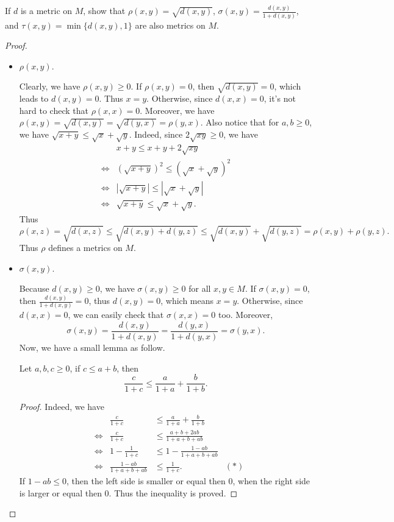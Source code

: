 \documentclass[12pt, a4paper]{article}
\theoremstyle{plain}
\begin{document}
\begin{exercise}{6}
If $d$ is a metric on $M$, show that $\rho(x,y)=\sqrt{d(x,y)}$, $\sigma(x,y)=\frac{d(x,y)}{1+d(x,y)}$, and $\tau(x,y)=\min\{d(x,y),1\}$ are also metrics on $M$. 
\end{exercise}
	\begin{proof}
	\hfill
		\begin{itemize}
		\item $\rho(x,y)$.
		
Clearly, we have $\rho(x,y)\geq 0$. If $\rho(x,y)=0$, then $\sqrt{d(x,y)}=0$, which leads to $d(x,y)=0$. Thus $x=y$. Otherwise, since $d(x,x)=0$, it's not hard to check that $\rho(x,x)=0$. Moreover, we have $\rho(x,y)=\sqrt{d(x,y)}=\sqrt{d(y,x)}=\rho(y,x)$. Also notice that for $a,b\geq 0$, we have $\sqrt{x+y}\leq \sqrt{x}+\sqrt{y}$. Indeed, since $2\sqrt{xy}\geq 0$, we have
		\begin{align*}
		&x+y\leq x+y+2\sqrt{xy}\\
		\Leftrightarrow &(\sqrt{x+y})^2\leq (\sqrt{x}+\sqrt{y})^2\\
		\Leftrightarrow & |\sqrt{x+y}|\leq |\sqrt{x}+\sqrt{y}|\\
		\Leftrightarrow & \sqrt{x+y}\leq \sqrt{x}+\sqrt{y}.
		\end{align*}		
		Thus
		\[
		\rho(x,z)=\sqrt{d(x,z)}\leq \sqrt{d(x,y)+d(y,z)} \leq \sqrt{d(x,y)}+\sqrt{d(y,z)}=\rho(x,y)+\rho(y,z).
		\] 
Thus $\rho$ defines a metrics on $M$.
		\item $\sigma(x,y)$.
		
		Because $d(x,y)\geq 0$, we have $\sigma(x,y)\geq 0$ for all $x,y\in M$. If $\sigma(x,y)=0$, then $\frac{d(x,y)}{1+d(x,y)}=0$, thus $d(x,y)=0$, which means $x=y$. Otherwise, since $d(x,x)=0$, we can easily check that $\sigma(x,x)=0$ too. Moreover,
		\[
		\sigma(x,y)=\frac{d(x,y)}{1+d(x,y)}=\frac{d(y,x)}{1+d(y,x)}=\sigma(y,x).
		\]
		Now, we have a small lemma as follow. 
		\begin{lemma}
		
		Let $a,b,c\geq 0$, if $c\leq a+b$, then 
		\[
		\frac{c}{1+c}\leq \frac{a}{1+a}+\frac{b}{1+b}.
		\]
		\end{lemma}
		
			\begin{proof}
			Indeed, we have
			\begin{align*}
			&&\frac{c}{1+c}&\leq \frac{a}{1+a}+\frac{b}{1+b}\\
			&\Leftrightarrow& \frac{c}{1+c}&\leq \frac{a+b+2ab}{1+a+b+ab}\\
			&\Leftrightarrow& 1-\frac{1}{1+c}&\leq 1-\frac{1-ab}{1+a+b+ab}\\
			&\Leftrightarrow& \frac{1-ab}{1+a+b+ab}&\leq \frac{1}{1+c}.&(*)
			\end{align*}
			If $1-ab\leq 0$, then the left side is smaller or equal then $0$, when the right side is larger or equal then $0$. Thus the inequality is proved.
		

\end{proof}
\end{itemize}
\end{proof}
\end{document}
